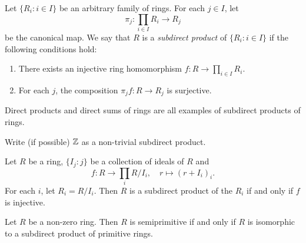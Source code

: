 
\begin{definition}
    Let $\{R_i:i\in I\}$ be an arbitrary family of rings. For each 
    $j\in I$, let 
    \[
    \pi_j\colon \prod_{i\in I}R_i\to R_j
    \]
    be the
    canonical map. We say that $R$ is a \emph{subdirect product}
    of $\{R_i:i\in I\}$ if the following conditions hold:
    \begin{enumerate}
        \item There exists an injective ring homomorphism $f\colon R\to \prod_{i\in I}R_i$. 
        \item For each $j$, the composition 
        $\pi_jf\colon R\to R_j$ is surjective. 
    \end{enumerate}
\end{definition}

Direct products and direct sums of rings are all examples of subdirect products of rings. 

\begin{exercise}
\label{xca:Z_semiprimitive}
    Write (if possible) $\mathbb{Z}$ as a non-trivial subdirect product. 
\end{exercise}

\begin{example}
    Let $R$ be a ring,  
    $\{I_j:j\}$ be a collection of ideals of $R$ and
    \[
    f\colon R\to \prod_i R/I_i,
    \quad
    r\mapsto (r+I_i)_i.
    \]
    For each
    $i$, let $R_i=R/I_i$. Then $R$ is a subdirect product
    of the $R_i$ if and only if $f$ is injective. 
\end{example}



\begin{theorem}
	\label{thm:subdirecto}
	Let $R$ be a non-zero ring. Then $R$ is semiprimitive if and only if
	$R$ is isomorphic to a subdirect product of primitive rings. 
\end{theorem}

